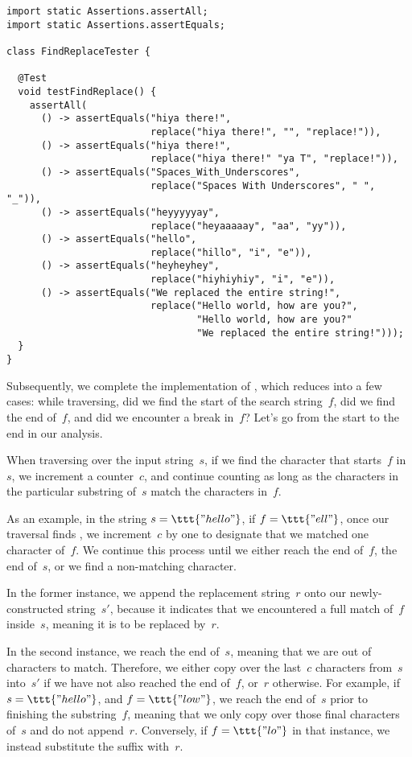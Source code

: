 \begin{lstlisting}[language=MyJava]
import static Assertions.assertAll;
import static Assertions.assertEquals;

class FindReplaceTester {

  @Test
  void testFindReplace() {
    assertAll(
      () -> assertEquals("hiya there!",
                         replace("hiya there!", "", "replace!")),
      () -> assertEquals("hiya there!",
                         replace("hiya there!" "ya T", "replace!")),
      () -> assertEquals("Spaces_With_Underscores",
                         replace("Spaces With Underscores", " ", "_")),
      () -> assertEquals("heyyyyyay",
                         replace("heyaaaaay", "aa", "yy")),
      () -> assertEquals("hello",
                         replace("hillo", "i", "e")),
      () -> assertEquals("heyheyhey",
                         replace("hiyhiyhiy", "i", "e")),
      () -> assertEquals("We replaced the entire string!",
                         replace("Hello world, how are you?", 
                                 "Hello world, how are you?" 
                                 "We replaced the entire string!")));
  }
}
\end{lstlisting}

Subsequently, we complete the implementation of , which reduces into a few cases: while traversing, did we find the start of the search string~$f$, did we find the end of~$f$, and did we encounter a break in~$f$? 
Let's go from the start to the end in our analysis. 

When traversing over the input string~$s$, if we find the character that starts~$f$ in~$s$, we increment a counter~$c$, and continue counting as long as the characters in the particular substring of~$s$ match the characters in~$f$.

As an example, in the string $s=\ttt{"hello"}$, if $f=\ttt{"ell"}$, once our traversal finds , we increment~$c$ by one to designate that we matched one character of~$f$. 
We continue this process until we either reach the end of~$f$, the end of~$s$, or we find a non-matching character. 

In the former instance, we append the replacement string~$r$ onto our newly-constructed string~$s'$, because it indicates that we encountered a full match of~$f$ inside~$s$, meaning it is to be replaced by~$r$.

In the second instance, we reach the end of~$s$, meaning that we are out of characters to match. 
Therefore, we either copy over the last~$c$ characters from~$s$ into~$s'$ if we have not also reached the end of~$f$, or~$r$ otherwise. 
For example, if $s=\ttt{"hello"}$, and $f=\ttt{"low"}$, we reach the end of~$s$ prior to finishing the substring~$f$, meaning that we only copy over those final characters of~$s$ and do not append~$r$. 
Conversely, if $f=\ttt{"lo"}$ in that instance, we instead substitute the suffix  with~$r$. 

